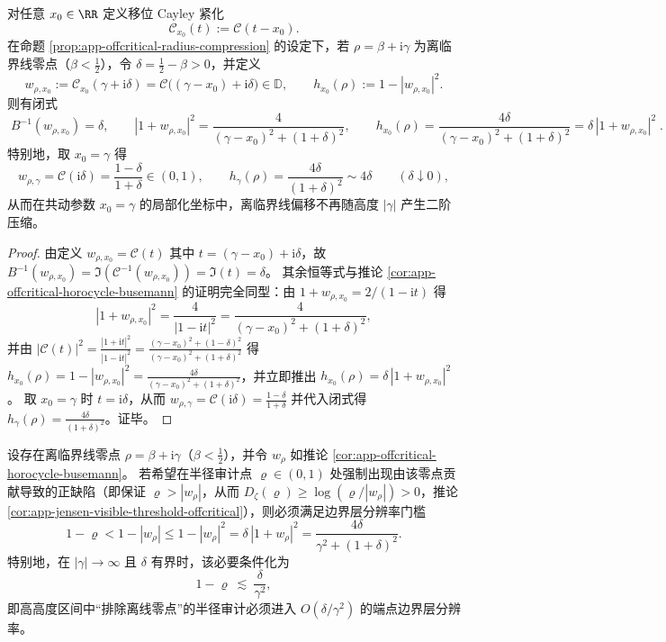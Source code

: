 \begin{theorem}\label{thm:app-comoving-horizon-localization}
对任意 \(x_{0}\in\RR\) 定义移位 Cayley 紧化
\[
\mathcal{C}_{x_{0}}(t):=\mathcal{C}(t-x_{0}).
\]
在命题 \ref{prop:app-offcritical-radius-compression} 的设定下，若 \(\rho=\beta+\mathrm{i}\gamma\) 为离临界线零点（\(\beta<\tfrac12\)），令 \(\delta=\tfrac12-\beta>0\)，并定义
\[
w_{\rho,x_{0}}:=\mathcal{C}_{x_{0}}(\gamma+\mathrm{i}\delta)=\mathcal{C}\bigl((\gamma-x_{0})+\mathrm{i}\delta\bigr)\in\mathbb{D},
\qquad
h_{x_{0}}(\rho):=1-|w_{\rho,x_{0}}|^{2}.
\]
则有闭式
\[
\boxed{\;
B^{-1}(w_{\rho,x_{0}})=\delta,\qquad
|1+w_{\rho,x_{0}}|^{2}=\frac{4}{(\gamma-x_{0})^{2}+(1+\delta)^{2}},\qquad
h_{x_{0}}(\rho)=\frac{4\delta}{(\gamma-x_{0})^{2}+(1+\delta)^{2}}
=\delta\,|1+w_{\rho,x_{0}}|^{2}\; }.
\]
特别地，取 \(x_{0}=\gamma\) 得
\[
w_{\rho,\gamma}=\mathcal{C}(\mathrm{i}\delta)=\frac{1-\delta}{1+\delta}\in(0,1),
\qquad
h_{\gamma}(\rho)=\frac{4\delta}{(1+\delta)^{2}}\sim 4\delta\qquad(\delta\downarrow 0),
\]
从而在共动参数 \(x_{0}=\gamma\) 的局部化坐标中，离临界线偏移不再随高度 \(|\gamma|\) 产生二阶压缩。
\end{theorem}

\begin{proof}
由定义 \(w_{\rho,x_{0}}=\mathcal{C}(t)\) 其中 \(t=(\gamma-x_{0})+\mathrm{i}\delta\)，故
\(
B^{-1}(w_{\rho,x_{0}})=\Im(\mathcal{C}^{-1}(w_{\rho,x_{0}}))=\Im(t)=\delta
\)。
其余恒等式与推论 \ref{cor:app-offcritical-horocycle-busemann} 的证明完全同型：由 \(1+w_{\rho,x_{0}}=2/(1-\mathrm{i}t)\) 得
\[
|1+w_{\rho,x_{0}}|^{2}=\frac{4}{|1-\mathrm{i}t|^{2}}=\frac{4}{(\gamma-x_{0})^{2}+(1+\delta)^{2}},
\]
并由 \(|\mathcal{C}(t)|^{2}=\frac{|1+\mathrm{i}t|^{2}}{|1-\mathrm{i}t|^{2}}=\frac{(\gamma-x_{0})^{2}+(1-\delta)^{2}}{(\gamma-x_{0})^{2}+(1+\delta)^{2}}\) 得
\(
h_{x_{0}}(\rho)=1-|w_{\rho,x_{0}}|^{2}=\frac{4\delta}{(\gamma-x_{0})^{2}+(1+\delta)^{2}}
\)，并立即推出 \(h_{x_{0}}(\rho)=\delta\,|1+w_{\rho,x_{0}}|^{2}\)。
取 \(x_{0}=\gamma\) 时 \(t=\mathrm{i}\delta\)，从而 \(w_{\rho,\gamma}=\mathcal{C}(\mathrm{i}\delta)=\frac{1-\delta}{1+\delta}\) 并代入闭式得 \(h_{\gamma}(\rho)=\frac{4\delta}{(1+\delta)^{2}}\)。证毕。
\end{proof}

\begin{corollary}\label{cor:app-horocycle-visible-resolution}
设存在离临界线零点 \(\rho=\beta+\mathrm{i}\gamma\)（\(\beta<\tfrac12\)），并令 \(w_{\rho}\) 如推论 \ref{cor:app-offcritical-horocycle-busemann}。
若希望在半径审计点 \(\varrho\in(0,1)\) 处强制出现由该零点贡献导致的正缺陷（即保证 \(\varrho>|w_{\rho}|\)，从而 \(D_{\zeta}(\varrho)\ge \log(\varrho/|w_{\rho}|)>0\)，推论 \ref{cor:app-jensen-visible-threshold-offcritical}），则必须满足边界层分辨率门槛
\[
1-\varrho<1-|w_{\rho}|
\le 1-|w_{\rho}|^{2}
=\delta\,|1+w_{\rho}|^{2}
=\frac{4\delta}{\gamma^{2}+(1+\delta)^{2}}.
\]
特别地，在 \(|\gamma|\to\infty\) 且 \(\delta\) 有界时，该必要条件化为
\[
1-\varrho\ \lesssim\ \frac{\delta}{\gamma^{2}},
\]
即高高度区间中“排除离线零点”的半径审计必须进入 \(O(\delta/\gamma^{2})\) 的端点边界层分辨率。
\end{corollary}

